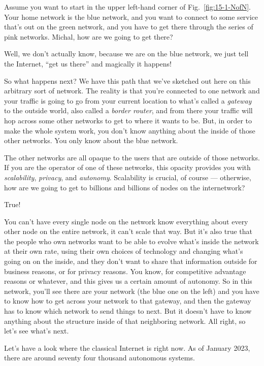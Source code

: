 Assume you want to start in the upper left-hand corner of Fig.~\ref{fig:15-1-NofN}. Your home network is the blue network, and you want to connect to some service that's out on the green network, and you have to get there through the series of pink networks. Michal, how are we going to get there?

\mmm Well, we don't actually know, because we are on the blue network, we just tell the Internet, ``get us there'' and magically it happens!

\rrr So what happens next? We have this path that we've sketched out here on this arbitrary sort of network. The reality is that you're connected to one network and your traffic is going to go from your current location to what's called a \emph{gateway} to the outside world, also called a \emph{border router}, and from there your traffic will hop across some other networks to get to where it wants to be. But, in order to make the whole system work, you don't know anything about the inside of those other networks. You only know about the blue network.

The other networks are all opaque to the users that are outside of those networks. If you are the operator of one of these networks, this opacity provides you with \emph{scalability}, \emph{privacy}, and \emph{autonomy}. Scalability is crucial, of course --- otherwise, how are we going to get to billions and billions of nodes on the internetwork?

\mmm True!

\rrr You can't have every single node on the network know everything about every other node on the entire network, it can't scale that way. But it's also true that the people who own networks want to be able to evolve what's inside the network at their own rate, using their own choices of technology and changing what's going on on the inside, and they don't want to share that information outside for business reasons, or for privacy reasons. You know, for competitive advantage reasons or whatever, and this gives us a certain amount of autonomy. So in this network, you'll see there are your network (the blue one on the left) and you have to know how to get across your network to that gateway, and then the gateway has to know which network to send things to next. But it doesn't have to know anything about the structure inside of that neighboring network. All right, so let's see what's next.

\mmm Let's have a look where the classical Internet is right now. As of January 2023, there are around seventy four thousand autonomous systems.

